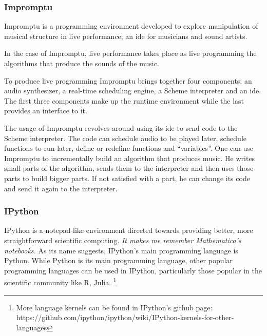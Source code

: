 \documentclass{./llncs2e/llncs}
\begin{document}
\subsubsection{Impromptu\cite{sorensen2005impromptu}\cite{sorensen2010programming}}
	Impromptu is a programming environment developed to explore manipulation of musical structure in live performance; an \ac{ide} for musicians and sound artists.
	
	In the case of Impromptu, live performance takes place as live programming the algorithms that produce the sounds of the music.
	
	To produce live programming Impromptu brings together four components: an audio synthesizer, a real-time scheduling engine, a Scheme interpreter and an \ac{ide}. 
	The first three components make up the runtime environment while the last provides an interface to it. 
	
	The usage of Impromptu revolves around using its \ac{ide} to send code to the Scheme interpreter. 
	The code can schedule audio to be played later, schedule functions to run later, define or redefine functions and ``variables''. 
	One can use Impromptu to incrementally build an algorithm that produces music. 
	He writes small parts of the algorithm, sends them to the interpreter and then uses those parts to build bigger parts. 
	If not satisfied with a part, he can change its code and send it again to the interpreter.
	
	
\subsubsection{IPython\cite{PER-GRA:2007}}
	IPython is a notepad-like environment directed towards providing better, more straightforward scientific computing. \emph{It makes me remember Mathematica's notebooks.} As its name suggests, IPython's main programming language is Python. 
	While Python is its main programming language, other popular programming languages can be used in IPython, particularly those popular in the scientific community like R, Julia. \footnote{More language kernels can be found in IPython's github page: https://github.com/ipython/ipython/wiki/IPython-kernels-for-other-languages}
	
\end{document}
